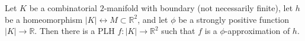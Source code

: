 Let $K$ be a combinatorial $2$-manifold with boundary (not necessarily finite), let $h$ be a homeomorphism $|K| \leftrightarrow M \subset \mathbb{R}^2$, and let $\phi$ be a strongly positive function $|K| \to \mathbb{R}$. Then there is a PLH $f: |K| \to \mathbb{R}^2$ such that $f$ is a $\phi$-approximation of $h$.
